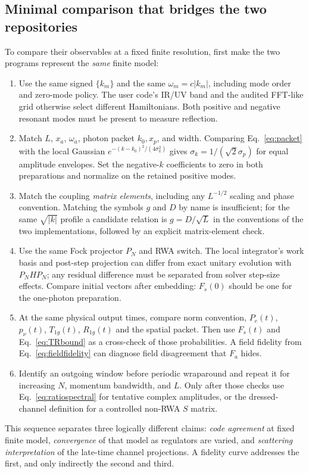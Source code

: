 \documentclass[11pt,a4paper]{article}
\begin{document}
\subsection{Minimal comparison that bridges the two repositories}
To compare their observables at a fixed finite resolution, first make the two programs represent the \emph{same} finite model:
\begin{enumerate}[leftmargin=*,label=\arabic*.]
\item Use the same signed $\{k_m\}$ and the same $\omega_m=c|k_m|$, including mode order and zero-mode policy. The user code's IR/UV band and the audited FFT-like grid otherwise select different Hamiltonians. Both positive and negative resonant modes must be present to measure reflection.
\item Match $L$, $x_a$, $\omega_a$, photon packet $k_0,x_p$, and width. Comparing Eq.~\eqref{eq:packet} with the local Gaussian $e^{-(k-k_0)^2/(4\sigma_k^2)}$ gives $\sigma_k=1/(\sqrt2\sigma_p)$ for equal amplitude envelopes. Set the negative-$k$ coefficients to zero in both preparations and normalize on the retained positive modes.
\item Match the coupling \emph{matrix elements}, including any $L^{-1/2}$ scaling and phase convention. Matching the symbols $g$ and $D$ by name is insufficient; for the same $\sqrt{|k|}$ profile a candidate relation is $g=D/\sqrt L$ in the conventions of the two implementations, followed by an explicit matrix-element check.
\item Use the same Fock projector $P_N$ and RWA switch. The local integrator's work basis and post-step projection can differ from exact unitary evolution with $P_NHP_N$; any residual difference must be separated from solver step-size effects. Compare initial vectors after embedding: $F_s(0)$ should be one for the one-photon preparation.
\item At the same physical output times, compare norm convention, $P_e(t)$, $p_\nu(t)$, $T_{1g}(t)$, $R_{1g}(t)$ and the spatial packet. Then use $F_s(t)$ and Eq.~\eqref{eq:TRbound} as a cross-check of those probabilities. A field fidelity from Eq.~\eqref{eq:fieldfidelity} can diagnose field disagreement that $F_a$ hides.
\item Identify an outgoing window before periodic wraparound and repeat it for increasing $N$, momentum bandwidth, and $L$. Only after those checks use Eq.~\eqref{eq:ratiospectral} for tentative complex amplitudes, or the dressed-channel definition for a controlled non-RWA $S$ matrix.
\end{enumerate}
This sequence separates three logically different claims: \emph{code agreement} at fixed finite model, \emph{convergence} of that model as regulators are varied, and \emph{scattering interpretation} of the late-time channel projections. A fidelity curve addresses the first, and only indirectly the second and third.
\end{document}
